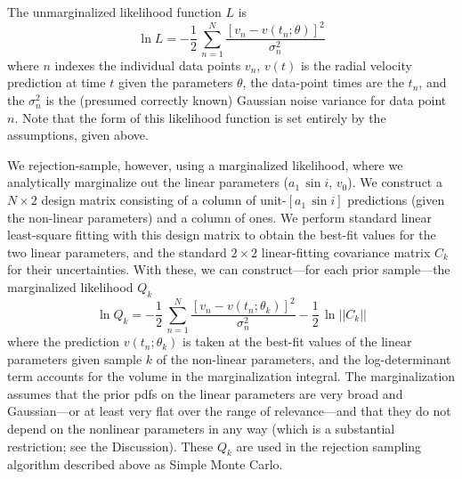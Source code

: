 \documentclass[manuscript, letterpaper]{aastex6}
\newcommand{\asini}{\ensuremath{a_1\,\sin i}}
\begin{document}
The unmarginalized likelihood function $L$ is
\begin{equation}
\ln L = -\frac{1}{2}\,\sum_{n=1}^N \frac{[v_n - v(t_n;\theta)]^2}{\sigma_n^2}
\end{equation}
where $n$ indexes the individual data points $v_n$, $v(t)$ is the
radial velocity prediction at time $t$ given the parameters $\theta$, the
data-point times are the $t_n$, and the $\sigma_n^2$ is the (presumed
correctly known) Gaussian noise variance for data point $n$.
Note that the form of this likelihood function is set entirely by
the assumptions, given above.

We rejection-sample, however, using a marginalized likelihood, where
we analytically marginalize out the linear parameters ($\asini$,
$v_0$).
We construct a $N\times 2$ design matrix consisting of a column of
unit-$[\asini]$ predictions (given the non-linear parameters) and a
column of ones.
We perform standard linear least-square fitting with this design
matrix to obtain the best-fit values for the two linear parameters,
and the standard $2\times 2$ linear-fitting covariance matrix $C_k$ for their
uncertainties.
With these, we can construct---for each prior sample---the marginalized likelihood $Q_k$
\begin{equation}
\ln Q_k = -\frac{1}{2}\,\sum_{n=1}^N \frac{[v_n - v(t_n;\theta_k)]^2}{\sigma_n^2} -\frac{1}{2}\,\ln ||C_k||
\end{equation}
where the prediction $v(t_n;\theta_k)$ is taken at the best-fit values
of the linear parameters given sample $k$ of the non-linear
parameters, and the log-determinant term accounts for the volume in
the marginalization integral.
The marginalization assumes that the prior pdfs on the linear parameters
are very broad and Gaussian---or
at least very flat over the range of relevance---and that they do not depend
on the nonlinear parameters in any way (which is a substantial restriction;
see the Discussion).
These $Q_k$ are used in the rejection sampling algorithm described above
as Simple Monte Carlo.
\end{document}
